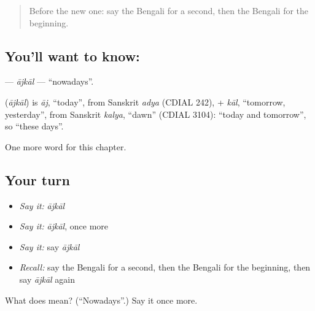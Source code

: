 \label{lesson:BN-C93-ajkal}



\begin{quote}
Before the new one: say the Bengali for a second, then the Bengali for the beginning.
\end{quote}

\subsection*{You'll want to know: }
\textbf{} — \emph{ājkāl} — \textquotedblleft{}nowadays\textquotedblright{}.

\begin{cousinweb}
\textbf{} (\emph{ājkāl}) is \emph{āj}, \textquotedblleft{}today\textquotedblright{}, from Sanskrit \emph{adya} (CDIAL 242), + \emph{kāl}, \textquotedblleft{}tomorrow, yesterday\textquotedblright{}, from Sanskrit \emph{kalya}, \textquotedblleft{}dawn\textquotedblright{} (CDIAL 3104): \textquotedblleft{}today and tomorrow\textquotedblright{}, so \textquotedblleft{}these days\textquotedblright{}.
\end{cousinweb}

\begin{grammarlens}[title={What you've built}]
One more word for this chapter.
\end{grammarlens}

\subsection*{Your turn}
\begin{itemize}
\raggedright
  \item \emph{Say it:} \emph{ājkāl}
  \item \emph{Say it:} \emph{ājkāl}, once more
  \item \emph{Say it:} say \emph{ājkāl}
  \item \emph{Recall:} say the Bengali for a second, then the Bengali for the beginning, then say \emph{ājkāl} again
\end{itemize}

\begin{tcolorbox}[breakable,colback=teal!4,colframe=teal!35!black,title={Before you move on}]
What does  mean? (\textquotedblleft{}Nowadays\textquotedblright{}.) Say it once more.
\end{tcolorbox}
